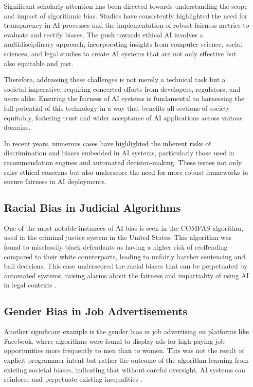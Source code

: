 Significant scholarly attention has been directed towards understanding the scope and impact of algorithmic bias. Studies have consistently highlighted the need for transparency in AI processes and the implementation of robust fairness metrics to evaluate and rectify biases. The push towards ethical AI involves a multidisciplinary approach, incorporating insights from computer science, social sciences, and legal studies to create AI systems that are not only effective but also equitable and just.

Therefore, addressing these challenges is not merely a technical task but a societal imperative, requiring concerted efforts from developers, regulators, and users alike. Ensuring the fairness of AI systems is fundamental to harnessing the full potential of this technology in a way that benefits all sections of society equitably, fostering trust and wider acceptance of AI applications across various domains.

In recent years, numerous cases have highlighted the inherent risks of discrimination and biases embedded in AI systems, particularly those used in recommendation engines and automated decision-making. These issues not only raise ethical concerns but also underscore the need for more robust frameworks to ensure fairness in AI deployments.

\subsection{Racial Bias in Judicial Algorithms}
One of the most notable instances of AI bias is seen in the COMPAS algorithm, used in the criminal justice system in the United States. This algorithm was found to misclassify black defendants as having a higher risk of reoffending compared to their white counterparts, leading to unfairly harsher sentencing and bail decisions. This case underscored the racial biases that can be perpetuated by automated systems, raising alarms about the fairness and impartiality of using AI in legal contexts \cite{Mattu}.

\subsection{Gender Bias in Job Advertisements}
Another significant example is the gender bias in job advertising on platforms like Facebook, where algorithms were found to display ads for high-paying job opportunities more frequently to men than to women. This was not the result of explicit programmer intent but rather the outcome of the algorithm learning from existing societal biases, indicating that without careful oversight, AI systems can reinforce and perpetuate existing inequalities \cite{Lambrecht_Tucker_2019}.

